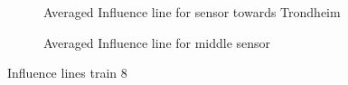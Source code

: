 \begin{figure}[htpb]
  \begin{subfigure}[t]{0.9\textwidth}
    \centering
    
    \label{heimdal_averaged}
  \end{subfigure}
  \begin{subfigure}[t]{0.9\textwidth}
    \centering
    
    \caption{Averaged Influence line for sensor towards Trondheim}
    \label{trondheim_averaged}
  \end{subfigure}
  \begin{subfigure}[t]{0.9\textwidth}
    \centering
    
    \caption{Averaged Influence line for middle sensor}
    \label{middle_averaged}
  \end{subfigure}
  \caption{Influence lines train 8}
  \label{influence_lines_train8}
\end{figure}

